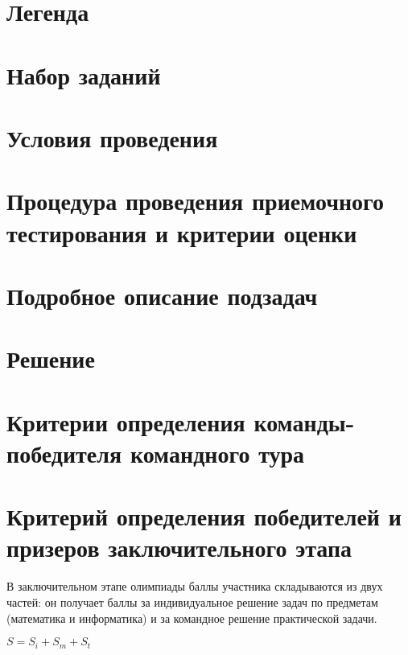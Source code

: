 \section{Легенда}


\section{Набор заданий}


\section{Условия проведения}


\section{Процедура проведения приемочного тестирования и критерии оценки}


\section{Подробное описание подзадач}


\section{Решение}


\section{Критерии определения команды-победителя командного тура}


\section{Критерий определения победителей и призеров
заключительного этапа}

В заключительном этапе олимпиады баллы участника складываются
из двух частей: он получает баллы за индивидуальное решение задач по
предметам (математика и информатика) и за командное решение
практической задачи.

\begin{center}
    $S = S_i + S_m + S_t$
\end{center}

